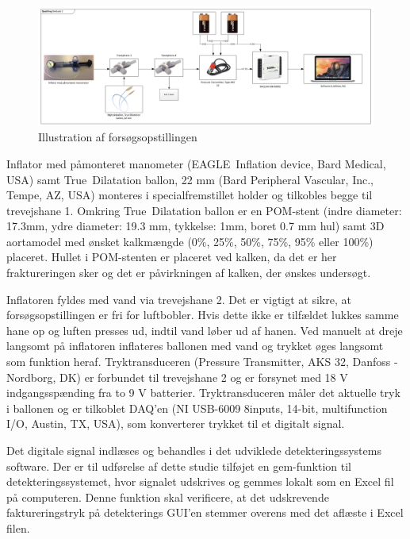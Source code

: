 \begin{figure}[H]
	\centering
	\includegraphics[width=1\textwidth]{Figure/Delstudie2opstilling}
	\caption{Illustration af forsøgsopstillingen }
	\label{opstilling}
\end{figure} 
 
Inflator med påmonteret manometer (EAGLE\texttrademark \ Inflation device, Bard Medical, USA) samt True\texttrademark \ Dilatation ballon, 22 mm (Bard Peripheral Vascular, Inc., Tempe, AZ, USA) monteres i specialfremstillet holder og tilkobles begge til trevejshane 1. Omkring True\texttrademark \ Dilatation ballon er en POM-stent (indre diameter: 17.3mm, ydre diameter: 19.3 mm, tykkelse: 1mm, boret 0.7 mm hul) samt 3D aortamodel med ønsket kalkmængde (0\%, 25\%, 50\%, 75\%, 95\% eller 100\%) placeret. Hullet i POM-stenten er placeret ved kalken, da det er her fraktureringen sker og det er påvirkningen af kalken, der ønskes undersøgt. 

Inflatoren fyldes med vand via trevejshane 2. Det er vigtigt at sikre, at forsøgsopstillingen er fri for luftbobler. Hvis dette ikke er tilfældet lukkes samme hane op og luften presses ud, indtil vand løber ud af hanen. Ved manuelt at dreje langsomt på inflatoren inflateres ballonen med vand og trykket øges langsomt som funktion heraf. Tryktransduceren (Pressure Transmitter, AKS 32, Danfoss - Nordborg, DK) er forbundet til trevejshane 2 og er forsynet med 18 V indgangsspænding fra to 9 V batterier. Tryktransduceren måler det aktuelle tryk i ballonen og er tilkoblet DAQ'en (NI USB-6009 8inputs, 14-bit, multifunction I/O, Austin, TX, USA), som konverterer trykket til et digitalt signal.

Det digitale signal indlæses og behandles i det udviklede detekteringssystems software. Der er til udførelse af dette studie tilføjet en gem-funktion til detekteringssystemet, hvor signalet udskrives og gemmes lokalt som en Excel fil på computeren. Denne funktion skal verificere, at det udskrevende faktureringstryk på detekterings GUI'en stemmer overens med det aflæste i Excel filen.  
 
